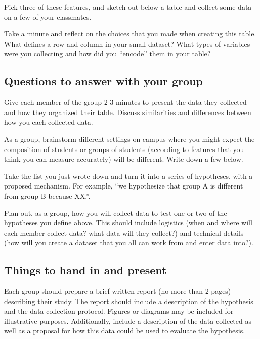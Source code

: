 \documentclass{article}\usepackage[]{graphicx}\usepackage[]{color}
\begin{document}
\bigskip

\begin{exercise}
Pick three of these features, and sketch out below a table and collect some data on a few of your classmates. 
\end{exercise}

\clearpage

\begin{exercise}
Take a minute and reflect on the choices that you made when creating this table. What defines a row and column in your small dataset? What types of variables were you collecting and how did you ``encode'' them in your table?
\end{exercise}

\subsection*{Questions to answer with your group}


\begin{exercise}
Give each member of the group 2-3 minutes to present the data they collected and how they organized their table. Discuss similarities and differences between how you each collected data.
\end{exercise}

\begin{exercise}
As a group, brainstorm different settings on campus where you might expect the composition of students or groups of students (according to features that you think you can measure accurately) will be different. Write down a few below. 
\end{exercise}

\vspace{7em}

\begin{exercise}
Take the list you just wrote down and turn it into a series of hypotheses, with a proposed mechanism. For example, ``we hypothesize that group A is different from group B because XX.''.
\end{exercise}

\vspace{7em}

\begin{exercise}
Plan out, as a group, how you will collect data to test one or two of the hypotheses you define above. This should include logistics (when and where will each member collect data? what data will they collect?) and technical details (how will you create a dataset that you all can work from and enter data into?).
\end{exercise}


\subsection*{Things to hand in and present}

Each group should prepare a brief written report (no more than 2 pages) describing their study. The report should include a description of the hypothesis and the data collection protocol. Figures or diagrams may be included for illustrative purposes. Additionally, include a description of the data collected as well as a proposal for how this data could be used to evaluate the hypothesis.
\end{document}
